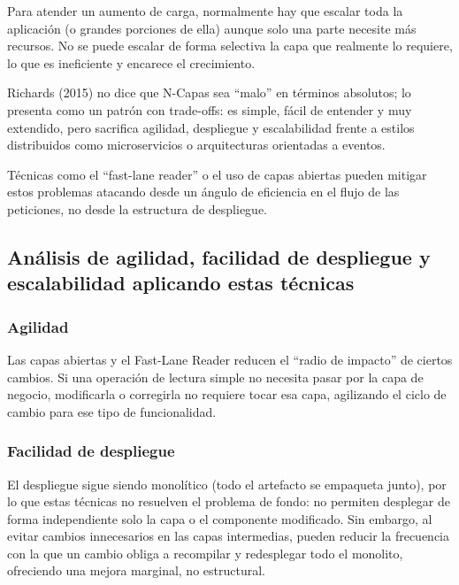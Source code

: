 \documentclass[12pt, a4paper]{article}
\begin{document}
        Para atender un aumento de carga, normalmente hay que escalar toda la aplicación (o grandes porciones de ella) aunque solo una parte necesite más recursos. No se puede escalar de forma selectiva la capa que realmente lo requiere, lo que es ineficiente y encarece el crecimiento.

        Richards (2015) no dice que N-Capas sea ``malo'' en términos absolutos; lo presenta como un patrón con trade-offs: es simple, fácil de entender y muy extendido, pero sacrifica agilidad, despliegue y escalabilidad frente a estilos distribuidos como microservicios o arquitecturas orientadas a eventos.
        
        Técnicas como el ``fast-lane reader'' o el uso de capas abiertas pueden mitigar estos problemas atacando desde un ángulo de eficiencia en el flujo de las peticiones, no desde la estructura de despliegue.

        \subsection{Análisis de agilidad, facilidad de despliegue y escalabilidad aplicando estas técnicas}
        
        \subsubsection*{Agilidad}
        
        Las capas abiertas y el Fast-Lane Reader reducen el ``radio de impacto'' de ciertos cambios. Si una operación de lectura simple no necesita pasar por la capa de negocio, modificarla o corregirla no requiere tocar esa capa, agilizando el ciclo de cambio para ese tipo de funcionalidad.
        
        \subsubsection*{Facilidad de despliegue}
        
        El despliegue sigue siendo monolítico (todo el artefacto se empaqueta junto), por lo que estas técnicas no resuelven el problema de fondo: no permiten desplegar de forma independiente solo la capa o el componente modificado. Sin embargo, al evitar cambios innecesarios en las capas intermedias, pueden reducir la frecuencia con la que un cambio obliga a recompilar y redesplegar todo el monolito, ofreciendo una mejora marginal, no estructural.
        
\end{document}
